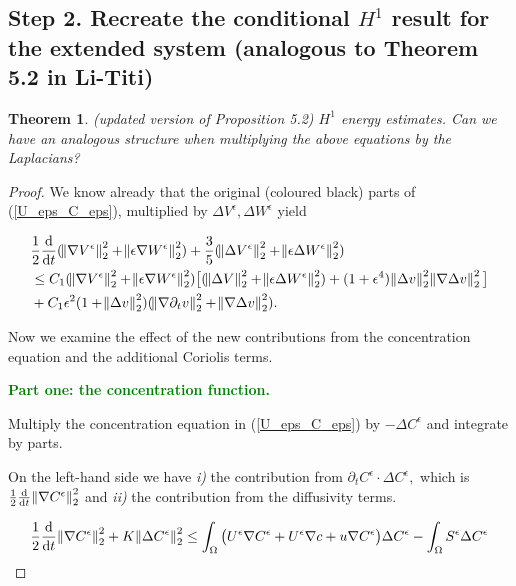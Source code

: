 \documentclass[11pt]{article}
\newtheorem{theorem}{Theorem}
\newcommand*\diff{\mathop{}\!\mathrm{d}}
\begin{document}
\subsection{Step 2. Recreate the conditional $H^1$ result for the extended system (analogous to Theorem 5.2 in Li-Titi)}

\begin{theorem}
(updated version of Proposition 5.2) $H^1$ energy estimates. Can we have an analogous structure when multiplying the above equations by the Laplacians?
\end{theorem}

\begin{proof}

We know already that the original (coloured black) parts of (\ref{U_eps_C_eps}), multiplied by $\Delta V^\epsilon, \Delta W^\epsilon$ yield

\begin{equation} \label{originalH1}
  \begin{split}
    & \frac{1}{2} \frac{\diff}{\diff t} (\norm{\nabla V^\epsilon}^2_2 + \norm{\epsilon \nabla W^\epsilon}^2_2) + \frac{3}{5} (\norm{\Delta V^\epsilon}^2_2 + \norm{\epsilon \Delta W^\epsilon}^2_2) \\
    & \leq C_1 (\norm{\nabla V^\epsilon}^2_2 + \norm{\epsilon \nabla W^\epsilon}^2_2) \big [ (\norm{\Delta V}^2_2 + \norm{\epsilon \Delta W^\epsilon}^2_2) + (1+ \epsilon^4) \norm{\Delta v}^2_2 \norm{\nabla \Delta v}^2_2 \big ] \\
    & + C_1 \epsilon^2 (1 + \norm{\Delta v}^2_2) (\norm{\nabla \partial_t v}^2_2 + \norm{\nabla \Delta v}^2_2).
  \end{split}
\end{equation}

Now we examine the effect of the new contributions from the concentration equation and the additional Coriolis terms.

\textcolor{green}{\textbf{Part one: the concentration function.}}

Multiply the concentration equation in (\ref{U_eps_C_eps}) by $- \Delta C^\epsilon$ and integrate by parts.

On the left-hand side we have \textit{i)} the contribution from $\partial_t C^\epsilon \cdot \Delta C^\epsilon,$ which is $\frac{1}{2}\frac{\diff}{\diff t} \norm{\nabla C^\epsilon}^2_2$ and \textit{ii)} the contribution from the diffusivity terms.

$$ \frac{1}{2}\frac{\diff}{\diff t} \norm{\nabla C^\epsilon}^2_2 + K \norm{\Delta C^\epsilon}_2^2 \leq \int_\Omega \big ( U^\epsilon \nabla C^\epsilon  + U^\epsilon \nabla c+ u \nabla C^\epsilon \big ) \Delta C^\epsilon - \int_\Omega S^\epsilon \Delta C^\epsilon$$


\end{proof}
\end{document}
